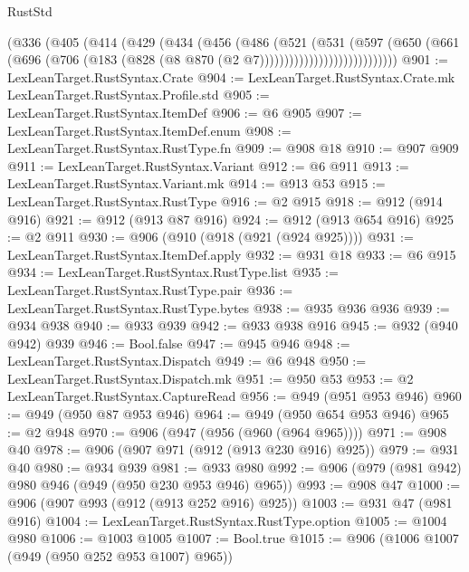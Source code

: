 \begin{lexlean}{RustStd}
\begin{coremodule}
                        (@336
                          (@405
                            (@414
                              (@429
                                (@434
                                  (@456
                                    (@486
                                      (@521
                                        (@531
                                          (@597
                                            (@650
                                              (@661
                                                (@696
                                                  (@706
                                                    (@183
                                                      (@828
                                                        (@8 @870 (@2 @7))))))))))))))))))))))))))))
@901 := LexLeanTarget.RustSyntax.Crate
@904 := LexLeanTarget.RustSyntax.Crate.mk LexLeanTarget.RustSyntax.Profile.std
@905 := LexLeanTarget.RustSyntax.ItemDef
@906 := @6 @905
@907 := LexLeanTarget.RustSyntax.ItemDef.enum
@908 := LexLeanTarget.RustSyntax.RustType.fn
@909 := @908 @18
@910 := @907 @909
@911 := LexLeanTarget.RustSyntax.Variant
@912 := @6 @911
@913 := LexLeanTarget.RustSyntax.Variant.mk
@914 := @913 @53
@915 := LexLeanTarget.RustSyntax.RustType
@916 := @2 @915
@918 := @912 (@914 @916)
@921 := @912 (@913 @87 @916)
@924 := @912 (@913 @654 @916)
@925 := @2 @911
@930 := @906 (@910 (@918 (@921 (@924 @925))))
@931 := LexLeanTarget.RustSyntax.ItemDef.apply
@932 := @931 @18
@933 := @6 @915
@934 := LexLeanTarget.RustSyntax.RustType.list
@935 := LexLeanTarget.RustSyntax.RustType.pair
@936 := LexLeanTarget.RustSyntax.RustType.bytes
@938 := @935 @936 @936
@939 := @934 @938
@940 := @933 @939
@942 := @933 @938 @916
@945 := @932 (@940 @942) @939
@946 := Bool.false
@947 := @945 @946
@948 := LexLeanTarget.RustSyntax.Dispatch
@949 := @6 @948
@950 := LexLeanTarget.RustSyntax.Dispatch.mk
@951 := @950 @53
@953 := @2 LexLeanTarget.RustSyntax.CaptureRead
@956 := @949 (@951 @953 @946)
@960 := @949 (@950 @87 @953 @946)
@964 := @949 (@950 @654 @953 @946)
@965 := @2 @948
@970 := @906 (@947 (@956 (@960 (@964 @965))))
@971 := @908 @40
@978 := @906 (@907 @971 (@912 (@913 @230 @916) @925))
@979 := @931 @40
@980 := @934 @939
@981 := @933 @980
@992 := @906 (@979 (@981 @942) @980 @946 (@949 (@950 @230 @953 @946) @965))
@993 := @908 @47
@1000 := @906 (@907 @993 (@912 (@913 @252 @916) @925))
@1003 := @931 @47 (@981 @916)
@1004 := LexLeanTarget.RustSyntax.RustType.option
@1005 := @1004 @980
@1006 := @1003 @1005
@1007 := Bool.true
@1015 := @906 (@1006 @1007 (@949 (@950 @252 @953 @1007) @965))

\end{coremodule}
\end{lexlean}
